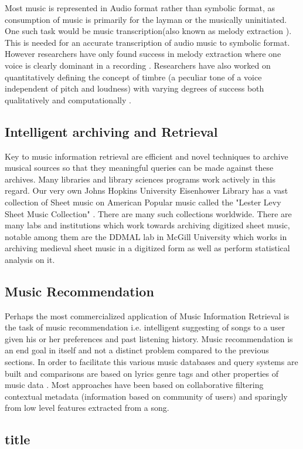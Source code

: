 \noindent Most music is represented in Audio format rather than symbolic format, as consumption of music is primarily for the layman or the musically uninitiated. One such task would be music transcription(also known as melody extraction \cite{melextract}). This is needed for an accurate transcription of audio music to symbolic format. However researchers have only found success in melody extraction where one voice is clearly dominant in a recording \cite{melextract}. Researchers have also worked on quantitatively defining the concept of timbre (a peculiar tone of a voice independent of pitch and loudness) with varying degrees of success both qualitatively \cite{timbrequal} and computationally \cite{musiclisteningthesis}. 

\subsection{Intelligent archiving and Retrieval}

\noindent Key to music information retrieval are efficient and novel techniques to archive musical sources so that they meaningful queries can be made against these archives. Many libraries and library sciences programs work actively in this regard. Our very own Johns Hopkins University Eisenhower Library has a vast collection of Sheet music on American Popular music called the "Lester Levy Sheet Music Collection" \cite{Levy:Collection:Online} . There are many such collections worldwide. There are many labs and institutions which work towards archiving digitized sheet music, notable among them are the DDMAL lab in McGill University \cite{DDMAL} which works in archiving medieval sheet music in a digitized form as well as perform statistical analysis on it. 

\subsection{Music Recommendation}

\noindent Perhaps the most commercialized application of Music Information Retrieval is the task of music recommendation i.e. intelligent suggesting of songs to a user given his or her preferences and past listening history. Music recommendation is an end goal in itself and not a distinct problem compared to the previous sections. In order to facilitate this various music databases and query systems are built and comparisons are based on lyrics genre tags and other properties of music data \cite{musicrecSurvey}. Most approaches have been based on collaborative filtering contextual metadata (information based on community of users) and sparingly from low level features extracted from a song. 

\subsection{title}



